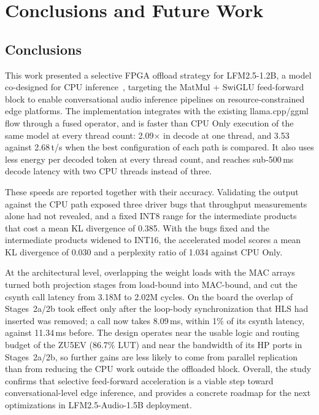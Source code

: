 \chapter{Conclusions and Future Work}
\label{cha:conclusioni}

\section{Conclusions}
\label{sec:conclusion}

This work presented a selective FPGA offload strategy for LFM2.5-1.2B, a model
co-designed for CPU inference~\cite{amini2025lfm2technicalreport}, targeting the MatMul +
SwiGLU feed-forward block to enable conversational audio inference pipelines on
resource-constrained edge platforms. The implementation integrates with the existing
llama.cpp/ggml flow through a fused operator, and is faster than CPU Only execution of
the same model at every thread count: 2.09$\times$ in decode at one thread, and 3.53
against 2.68\,t/s when the best configuration of each path is compared. It also uses less
energy per decoded token at every thread count, and reaches sub-500\,ms decode latency
with two CPU threads instead of three.

These speeds are reported together with their accuracy. Validating the output against
the CPU path exposed three driver bugs that throughput measurements alone had not
revealed, and a fixed INT8 range for the intermediate products that cost a mean KL
divergence of 0.385. With the bugs fixed and the intermediate products widened to INT16,
the accelerated model scores a mean KL divergence of 0.030 and a perplexity ratio of
1.034 against CPU Only.

At the architectural level, overlapping the weight loads with the MAC arrays turned both
projection stages from load-bound into MAC-bound, and cut the csynth call latency from
3.18M to 2.02M cycles. On the board the overlap of Stages~2a/2b took effect only after
the loop-body synchronization that HLS had inserted was removed; a call now takes
8.09\,ms, within 1\% of its csynth latency, against 11.34\,ms before. The design
operates near the usable logic and routing budget of the ZU5EV (86.7\% LUT) and near the
bandwidth of its HP ports in Stages~2a/2b, so further gains are less likely to come
from parallel replication than from reducing the CPU work outside the offloaded
block. Overall, the study confirms that selective feed-forward acceleration is
a viable step toward conversational-level edge inference, and provides a concrete
roadmap for the next optimizations in LFM2.5-Audio-1.5B deployment.

